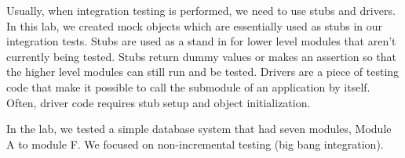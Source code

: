\documentclass[12pt, letterpaper, titlepage]{article}
\begin{document}
Usually, when integration testing is performed, we need to use stubs and drivers. In this lab, we created mock objects which are essentially used as stubs in our integration tests. Stubs are used as a stand in for lower level modules that aren't currently being tested. Stubs return dummy values or makes an assertion so that the higher level modules can still run and be tested. Drivers are a piece of testing code that make it possible to call the submodule of an application by itself. Often, driver code requires stub setup and object initialization. 

In the lab, we tested a simple database system that had seven modules, Module A to module F. We focused on non-incremental testing (big bang integration).
\end{document}
